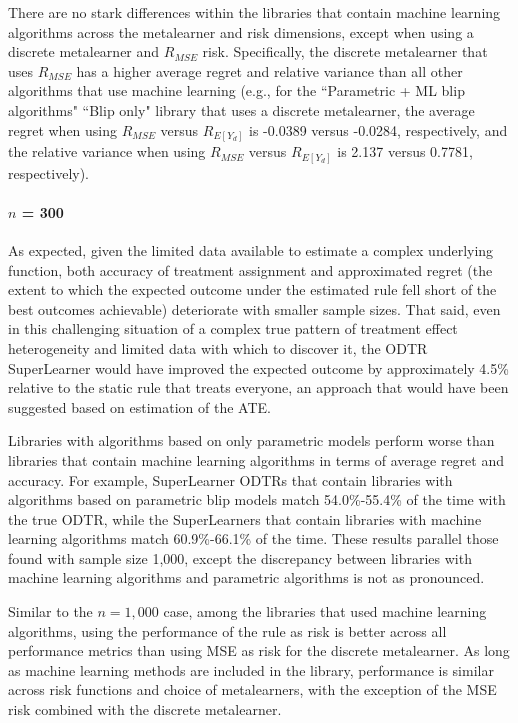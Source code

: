 \documentclass[a4paper,12pt]{article}
\begin{document}
There are no stark differences within the libraries that contain machine learning algorithms across the metalearner and risk dimensions, except when using a discrete metalearner and $R_{MSE}$ risk. Specifically, the discrete metalearner that uses $R_{MSE}$ has a higher average regret and relative variance than all other algorithms that use machine learning (e.g., for the ``Parametric + ML blip algorithms" ``Blip only" library that uses a discrete metalearner, the average regret when using $R_{MSE}$ versus $R_{E[Y_d]}$ is -0.0389 versus -0.0284, respectively, and the relative variance when using $R_{MSE}$ versus $R_{E[Y_d]}$ is 2.137 versus 0.7781, respectively). 





\paragraph{$n$ = 300}

As expected, given the limited data available to estimate a complex underlying function, both accuracy of treatment assignment and approximated regret (the extent to which the expected outcome under the estimated rule fell short of the best outcomes achievable) deteriorate with smaller sample sizes. That said, even in this challenging situation of a complex true pattern of treatment effect heterogeneity and limited data with which to discover it, the ODTR SuperLearner would have improved the expected outcome by approximately 4.5\% relative to the static rule that treats everyone, an approach that would have been suggested based on estimation of the ATE. 

Libraries with algorithms based on only parametric models perform worse than libraries that contain machine learning algorithms in terms of average regret and accuracy. For example, SuperLearner ODTRs that contain libraries with algorithms based on parametric blip models match 54.0\%-55.4\% of the time with the true ODTR, while the SuperLearners that contain libraries with machine learning algorithms match 60.9\%-66.1\% of the time. These results parallel those found with sample size 1,000, except the discrepancy between libraries with machine learning algorithms and parametric algorithms is not as pronounced.

Similar to the $n = 1,000$ case, among the libraries that used machine learning algorithms, using the performance of the rule as risk is better across all performance metrics than using MSE as risk for the discrete metalearner. As long as machine learning methods are included in the library, performance is similar across risk functions and choice of metalearners, with the exception of the MSE risk combined with the discrete metalearner.
\end{document}
